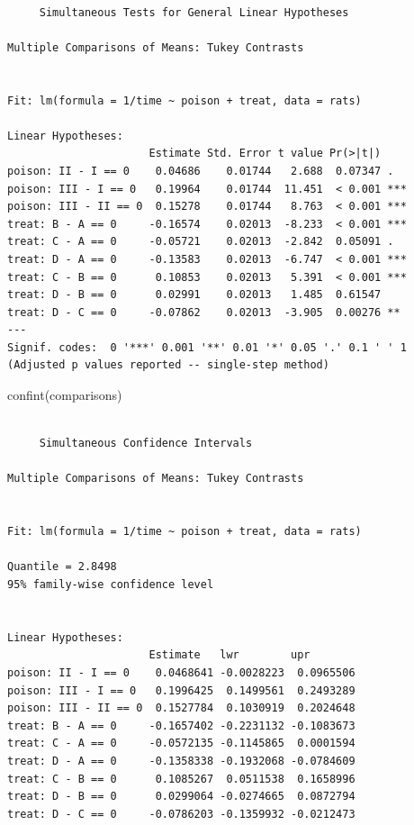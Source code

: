 \documentclass[
  dutch,
  letterpaper,
  12pt]{book}
\newenvironment{Shaded}{\begin{snugshade}}{\end{snugshade}}
\newcommand{\FunctionTok}[1]{\textcolor[rgb]{0.28,0.35,0.67}{#1}}
\newcommand{\NormalTok}[1]{\textcolor[rgb]{0.00,0.23,0.31}{#1}}
\theoremstyle{definition}
\theoremstyle{definition}
\theoremstyle{definition}
\theoremstyle{remark}
\begin{document}
\begin{verbatim}

     Simultaneous Tests for General Linear Hypotheses

Multiple Comparisons of Means: Tukey Contrasts


Fit: lm(formula = 1/time ~ poison + treat, data = rats)

Linear Hypotheses:
                      Estimate Std. Error t value Pr(>|t|)    
poison: II - I == 0    0.04686    0.01744   2.688  0.07347 .  
poison: III - I == 0   0.19964    0.01744  11.451  < 0.001 ***
poison: III - II == 0  0.15278    0.01744   8.763  < 0.001 ***
treat: B - A == 0     -0.16574    0.02013  -8.233  < 0.001 ***
treat: C - A == 0     -0.05721    0.02013  -2.842  0.05091 .  
treat: D - A == 0     -0.13583    0.02013  -6.747  < 0.001 ***
treat: C - B == 0      0.10853    0.02013   5.391  < 0.001 ***
treat: D - B == 0      0.02991    0.02013   1.485  0.61547    
treat: D - C == 0     -0.07862    0.02013  -3.905  0.00276 ** 
---
Signif. codes:  0 '***' 0.001 '**' 0.01 '*' 0.05 '.' 0.1 ' ' 1
(Adjusted p values reported -- single-step method)
\end{verbatim}

\begin{Shaded}
\begin{Highlighting}[]
\FunctionTok{confint}\NormalTok{(comparisons)}
\end{Highlighting}
\end{Shaded}

\begin{verbatim}

     Simultaneous Confidence Intervals

Multiple Comparisons of Means: Tukey Contrasts


Fit: lm(formula = 1/time ~ poison + treat, data = rats)

Quantile = 2.8498
95% family-wise confidence level
 

Linear Hypotheses:
                      Estimate   lwr        upr       
poison: II - I == 0    0.0468641 -0.0028223  0.0965506
poison: III - I == 0   0.1996425  0.1499561  0.2493289
poison: III - II == 0  0.1527784  0.1030919  0.2024648
treat: B - A == 0     -0.1657402 -0.2231132 -0.1083673
treat: C - A == 0     -0.0572135 -0.1145865  0.0001594
treat: D - A == 0     -0.1358338 -0.1932068 -0.0784609
treat: C - B == 0      0.1085267  0.0511538  0.1658996
treat: D - B == 0      0.0299064 -0.0274665  0.0872794
treat: D - C == 0     -0.0786203 -0.1359932 -0.0212473
\end{verbatim}
\end{document}
